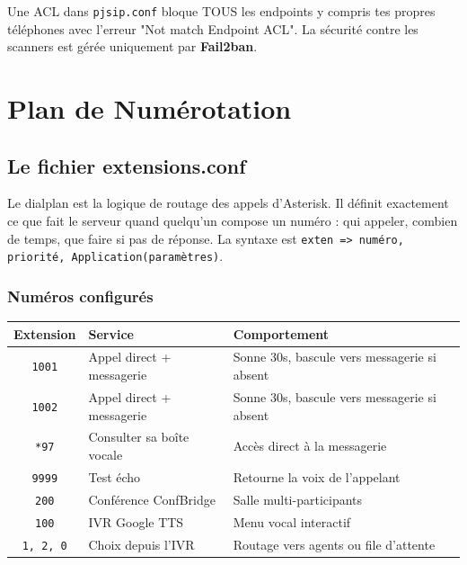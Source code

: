 \documentclass[a4paper,11pt]{report}
\begin{document}
\begin{dangerbox}
Une ACL dans \texttt{pjsip.conf} bloque TOUS les endpoints y compris tes propres téléphones avec l'erreur "Not match Endpoint ACL". La sécurité contre les scanners est gérée uniquement par \textbf{Fail2ban}.
\end{dangerbox}

\chapter{Plan de Numérotation}

\section{Le fichier extensions.conf}

\begin{infobox}
Le dialplan est la logique de routage des appels d'Asterisk. Il définit exactement ce que fait le serveur quand quelqu'un compose un numéro : qui appeler, combien de temps, que faire si pas de réponse. La syntaxe est \texttt{exten => numéro, priorité, Application(paramètres)}.
\end{infobox}

\subsection{Numéros configurés}

\begin{center}
\begin{tabular}{cll}
\toprule
\rowcolor{primarylight}\textbf{Extension} & \textbf{Service} & \textbf{Comportement}\\
\midrule
\texttt{1001} & Appel direct + messagerie & Sonne 30s, bascule vers messagerie si absent\\
\texttt{1002} & Appel direct + messagerie & Sonne 30s, bascule vers messagerie si absent\\
\texttt{*97} & Consulter sa boîte vocale & Accès direct à la messagerie\\
\texttt{9999} & Test écho & Retourne la voix de l'appelant\\
\texttt{200} & Conférence ConfBridge & Salle multi-participants\\
\texttt{100} & IVR Google TTS & Menu vocal interactif\\
\texttt{1, 2, 0} & Choix depuis l'IVR & Routage vers agents ou file d'attente\\
\bottomrule
\end{tabular}
\end{center}
\end{document}
